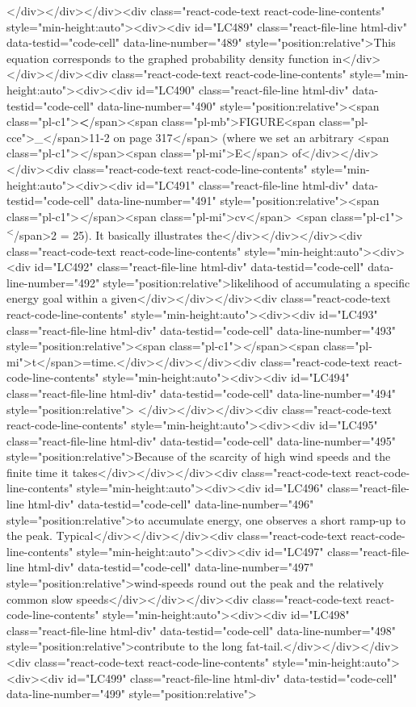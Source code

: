 {{{</div></div></div><div class="react-code-text react-code-line-contents" style="min-height:auto"><div><div id="LC489" class="react-file-line html-div" data-testid="code-cell" data-line-number="489" style="position:relative">This equation corresponds to the graphed probability density function in</div></div></div><div class="react-code-text react-code-line-contents" style="min-height:auto"><div><div id="LC490" class="react-file-line html-div" data-testid="code-cell" data-line-number="490" style="position:relative"><span class="pl-c1">\textbf</span>{<span class="pl-mb">FIGURE<span class="pl-cce">\_</span>11-2 on page 317</span>} (where we set an arbitrary <span class="pl-c1">\emph</span>{<span class="pl-mi">E</span>} of</div></div></div><div class="react-code-text react-code-line-contents" style="min-height:auto"><div><div id="LC491" class="react-file-line html-div" data-testid="code-cell" data-line-number="491" style="position:relative"><span class="pl-c1">\emph</span>{<span class="pl-mi">cv</span>} <span class="pl-c1">\textsuperscript</span>{2} = 25). It basically illustrates the</div></div></div><div class="react-code-text react-code-line-contents" style="min-height:auto"><div><div id="LC492" class="react-file-line html-div" data-testid="code-cell" data-line-number="492" style="position:relative">likelihood of accumulating a specific energy goal within a given</div></div></div><div class="react-code-text react-code-line-contents" style="min-height:auto"><div><div id="LC493" class="react-file-line html-div" data-testid="code-cell" data-line-number="493" style="position:relative"><span class="pl-c1">\emph</span>{<span class="pl-mi">t</span>}=time.</div></div></div><div class="react-code-text react-code-line-contents" style="min-height:auto"><div><div id="LC494" class="react-file-line html-div" data-testid="code-cell" data-line-number="494" style="position:relative">
</div></div></div><div class="react-code-text react-code-line-contents" style="min-height:auto"><div><div id="LC495" class="react-file-line html-div" data-testid="code-cell" data-line-number="495" style="position:relative">Because of the scarcity of high wind speeds and the finite time it takes</div></div></div><div class="react-code-text react-code-line-contents" style="min-height:auto"><div><div id="LC496" class="react-file-line html-div" data-testid="code-cell" data-line-number="496" style="position:relative">to accumulate energy, one observes a short ramp-up to the peak. Typical</div></div></div><div class="react-code-text react-code-line-contents" style="min-height:auto"><div><div id="LC497" class="react-file-line html-div" data-testid="code-cell" data-line-number="497" style="position:relative">wind-speeds round out the peak and the relatively common slow speeds</div></div></div><div class="react-code-text react-code-line-contents" style="min-height:auto"><div><div id="LC498" class="react-file-line html-div" data-testid="code-cell" data-line-number="498" style="position:relative">contribute to the long fat-tail.</div></div></div><div class="react-code-text react-code-line-contents" style="min-height:auto"><div><div id="LC499" class="react-file-line html-div" data-testid="code-cell" data-line-number="499" style="position:relative">
}}}
